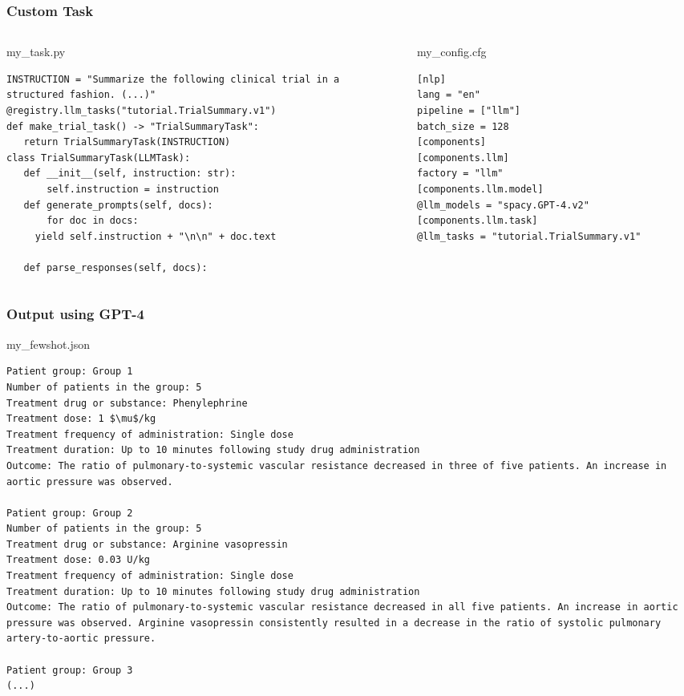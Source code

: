 \begin{frame}[fragile]\frametitle{Custom Task}
\begin{columns}
\begin{column}{0.5\textwidth}
my\_task.py
	\begin{lstlisting}
INSTRUCTION = "Summarize the following clinical trial in a 
structured fashion. (...)"
@registry.llm_tasks("tutorial.TrialSummary.v1")
def make_trial_task() -> "TrialSummaryTask":
   return TrialSummaryTask(INSTRUCTION)
class TrialSummaryTask(LLMTask):
   def __init__(self, instruction: str):
       self.instruction = instruction
   def generate_prompts(self, docs):
       for doc in docs:
     yield self.instruction + "\n\n" + doc.text
 
   def parse_responses(self, docs):
	\end{lstlisting}
\end{column}
\begin{column}{0.5\textwidth}
my\_conﬁg.cfg
	\begin{lstlisting}
[nlp]
lang = "en"
pipeline = ["llm"]
batch_size = 128
[components]
[components.llm]
factory = "llm"
[components.llm.model]
@llm_models = "spacy.GPT-4.v2"
[components.llm.task]
@llm_tasks = "tutorial.TrialSummary.v1"
	\end{lstlisting}
\end{column}
\end{columns}

\end{frame}


\begin{frame}[fragile]\frametitle{Output using GPT-4}
my\_fewshot.json

\begin{lstlisting}
Patient group: Group 1
Number of patients in the group: 5
Treatment drug or substance: Phenylephrine
Treatment dose: 1 $\mu$/kg
Treatment frequency of administration: Single dose
Treatment duration: Up to 10 minutes following study drug administration
Outcome: The ratio of pulmonary-to-systemic vascular resistance decreased in three of five patients. An increase in 
aortic pressure was observed.

Patient group: Group 2
Number of patients in the group: 5
Treatment drug or substance: Arginine vasopressin
Treatment dose: 0.03 U/kg
Treatment frequency of administration: Single dose
Treatment duration: Up to 10 minutes following study drug administration
Outcome: The ratio of pulmonary-to-systemic vascular resistance decreased in all five patients. An increase in aortic 
pressure was observed. Arginine vasopressin consistently resulted in a decrease in the ratio of systolic pulmonary 
artery-to-aortic pressure.

Patient group: Group 3
(...)
 
\end{lstlisting}
\end{frame}

